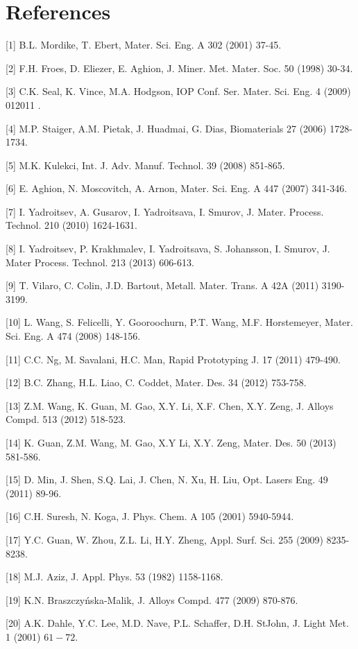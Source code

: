 \documentclass[10pt]{article}
\begin{document}
\section*{References}
[1] B.L. Mordike, T. Ebert, Mater. Sci. Eng. A 302 (2001) 37-45.

[2] F.H. Froes, D. Eliezer, E. Aghion, J. Miner. Met. Mater. Soc. 50 (1998) 30-34.

[3] C.K. Seal, K. Vince, M.A. Hodgson, IOP Conf. Ser. Mater. Sci. Eng. 4 (2009) 012011 .

[4] M.P. Staiger, A.M. Pietak, J. Huadmai, G. Dias, Biomaterials 27 (2006) 1728-1734.

[5] M.K. Kulekci, Int. J. Adv. Manuf. Technol. 39 (2008) 851-865.

[6] E. Aghion, N. Moscovitch, A. Arnon, Mater. Sci. Eng. A 447 (2007) 341-346.

[7] I. Yadroitsev, A. Gusarov, I. Yadroitsava, I. Smurov, J. Mater. Process. Technol. 210 (2010) 1624-1631.

[8] I. Yadroitsev, P. Krakhmalev, I. Yadroitsava, S. Johansson, I. Smurov, J. Mater Process. Technol. 213 (2013) 606-613.

[9] T. Vilaro, C. Colin, J.D. Bartout, Metall. Mater. Trans. A 42A (2011) 3190-3199.

[10] L. Wang, S. Felicelli, Y. Gooroochurn, P.T. Wang, M.F. Horstemeyer, Mater. Sci. Eng. A 474 (2008) 148-156.

[11] C.C. Ng, M. Savalani, H.C. Man, Rapid Prototyping J. 17 (2011) 479-490.

[12] B.C. Zhang, H.L. Liao, C. Coddet, Mater. Des. 34 (2012) 753-758.

[13] Z.M. Wang, K. Guan, M. Gao, X.Y. Li, X.F. Chen, X.Y. Zeng, J. Alloys Compd. 513 (2012) 518-523.

[14] K. Guan, Z.M. Wang, M. Gao, X.Y Li, X.Y. Zeng, Mater. Des. 50 (2013) 581-586.

[15] D. Min, J. Shen, S.Q. Lai, J. Chen, N. Xu, H. Liu, Opt. Lasers Eng. 49 (2011) 89-96.

[16] C.H. Suresh, N. Koga, J. Phys. Chem. A 105 (2001) 5940-5944.

[17] Y.C. Guan, W. Zhou, Z.L. Li, H.Y. Zheng, Appl. Surf. Sci. 255 (2009) 8235-8238.

[18] M.J. Aziz, J. Appl. Phys. 53 (1982) 1158-1168.

[19] K.N. Braszczyńska-Malik, J. Alloys Compd. 477 (2009) 870-876.

[20] A.K. Dahle, Y.C. Lee, M.D. Nave, P.L. Schaffer, D.H. StJohn, J. Light Met. 1 (2001) $61-72$.
\end{document}
